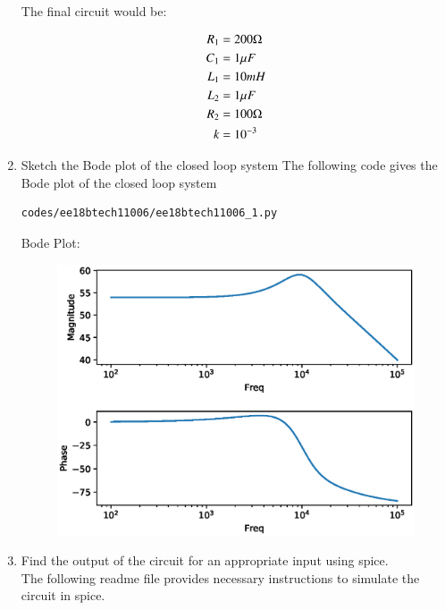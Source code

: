 \begin{enumerate}[label=\arabic*.,ref=\theenumi]
\begin{align}
\end{align}
The final circuit would be:
\begin{figure}[!ht]
	\begin{center}
		\resizebox{\columnwidth}{!}{}
	\end{center}
\caption{}
\label{fig:ee18btech11006_6}
\end{figure}
\begin{align}
R_1&= 200\ohm \\
C_1&= 1\mu F\\
L_1&= 10mH \\
L_2&=1\mu F\\
R_2&=100\ohm\\
k&=10^{-3}
\end{align}
\item Sketch the Bode plot of the closed loop system
\solution The following code gives the Bode plot of the closed loop system
\begin{lstlisting}
codes/ee18btech11006/ee18btech11006_1.py
\end{lstlisting}
Bode Plot:
\begin{figure}[ht!]
\centering
\includegraphics[width=\columnwidth]{./figs/ee18btech11006/ee18btech11006_7.eps}
\caption{}
\label{fig:ee18btech11006_7}
\end{figure}
\item Find the output of the circuit for an appropriate input using spice.\\
\solution
The following readme file provides necessary instructions to simulate the circuit in spice.
\begin{lstlisting}

\end{lstlisting}
\end{enumerate}
